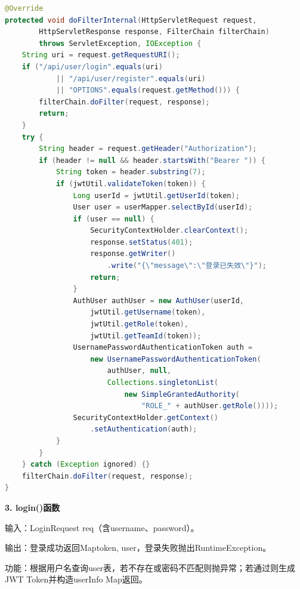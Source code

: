\documentclass[12pt,a4paper]{ctexart}
\begin{document}
\begin{lstlisting}[language=Java]
@Override
protected void doFilterInternal(HttpServletRequest request,
        HttpServletResponse response, FilterChain filterChain)
        throws ServletException, IOException {
    String uri = request.getRequestURI();
    if ("/api/user/login".equals(uri)
            || "/api/user/register".equals(uri)
            || "OPTIONS".equals(request.getMethod())) {
        filterChain.doFilter(request, response);
        return;
    }
    try {
        String header = request.getHeader("Authorization");
        if (header != null && header.startsWith("Bearer ")) {
            String token = header.substring(7);
            if (jwtUtil.validateToken(token)) {
                Long userId = jwtUtil.getUserId(token);
                User user = userMapper.selectById(userId);
                if (user == null) {
                    SecurityContextHolder.clearContext();
                    response.setStatus(401);
                    response.getWriter()
                        .write("{\"message\":\"登录已失效\"}");
                    return;
                }
                AuthUser authUser = new AuthUser(userId,
                    jwtUtil.getUsername(token),
                    jwtUtil.getRole(token),
                    jwtUtil.getTeamId(token));
                UsernamePasswordAuthenticationToken auth =
                    new UsernamePasswordAuthenticationToken(
                        authUser, null,
                        Collections.singletonList(
                            new SimpleGrantedAuthority(
                                "ROLE_" + authUser.getRole())));
                SecurityContextHolder.getContext()
                    .setAuthentication(auth);
            }
        }
    } catch (Exception ignored) {}
    filterChain.doFilter(request, response);
}
\end{lstlisting}

\textbf{3. login()函数}

输入：LoginRequest req（含username、password）。

输出：登录成功返回Map{token, user}，登录失败抛出RuntimeException。

功能：根据用户名查询user表，若不存在或密码不匹配则抛异常；若通过则生成JWT Token并构造userInfo Map返回。
\end{document}
